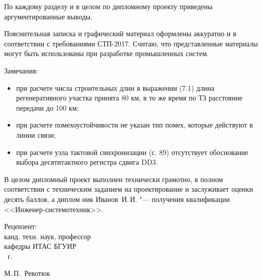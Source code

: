 \begin{singlespace}
{По каждому разделу и в целом по дипломному проекту приведены аргументированные выводы.

Пояснительная записка и графический материал оформлены аккуратно и в соответствии с требованиями СТП-2017.
Считаю, что представленные материалы могут быть использованы при разработке промышленных систем.

Замечания:
\begin{itemize}
  \item при расчете числа строительных длин в выражении (7.1) длина регенеративного участка принята 80 км, в то же время по ТЗ расстояние передачи до 100 км;
  \item при расчете помехоустойчивости не указан тип помех, которые действуют в линии связи;
  \item при расчете узла тактовой синхронизации (с. 89) отсутствует обоснование выбора десятитактного регистра сдвига DD3.
\end{itemize}

В целом дипломный проект выполнен технически грамотно, в полном соответствии с техническим заданием на проектирование и заслуживает оценки десять баллов, а диплом
ник Иванов~И.\,И. "--- получения квалификации <<Инженер-системотехник>>.

  \vfill
  \noindent
  \begin{minipage}{0.4\textwidth}
    \begin{flushleft}
      Рецензент:\\
      канд. техн. наук, профессор\\
      кафедры ИТАС БГУИР\\
      \underline{\hspace*{2em}} \underline{\hspace*{6.5em}} \the\year{}~г.
    \end{flushleft}
  \end{minipage}
  \begin{minipage}{0.58\textwidth}
    \begin{flushright}
    \underline{\hspace*{3cm}}\hspace*{0.5cm} М.\,П.~Ревотюк \\
    \end{flushright}
  \end{minipage}
}

\end{singlespace}
\clearpage